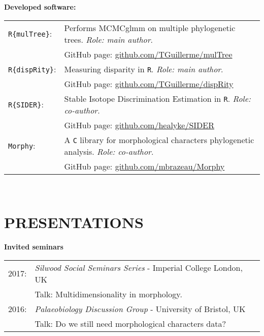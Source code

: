 \documentclass[10pt,a4paper]{article}
\begin{document}
{\raggedright\textbf{Developed software:}\\[1.5ex]
\begin{tabular}{ll}
\texttt{R\{mulTree\}}: & Performs MCMCglmm on multiple phylogenetic trees. \textit{Role: main author}.\\
                       & GitHub page: \href{https://github.com/TGuillerme/mulTree}{github.com/TGuillerme/mulTree} \\
\texttt{R\{dispRity\}}: & Measuring disparity in \texttt{R}. \textit{Role: main author}.\\
                       & GitHub page: \href{https://github.com/TGuillerme/dispRity}{github.com/TGuillerme/dispRity}\\
\texttt{R\{SIDER\}}: & Stable Isotope Discrimination Estimation in \texttt{R}. \textit{Role: co-author}. \\
                       & GitHub page: \href{https://github.com/healyke/SIDER}{github.com/healyke/SIDER} \\
\texttt{Morphy}: & A \texttt{C} library for morphological characters phylogenetic analysis. \textit{Role: co-author}. \\
                       & GitHub page: \href{https://github.com/mbrazeau/Morphy}{github.com/mbrazeau/Morphy} \\
\end{tabular} \\


\bigskip
\section{PRESENTATIONS}

\raggedright\textbf{Invited seminars}\\[1.5ex]
\begin{tabular}{ll}
2017: & \textit{Silwood Social Seminars Series} - Imperial College London, UK\\
& Talk: Multidimensionality in morphology.\\ 
2016: & \textit{Palaeobiology Discussion Group} - University of Bristol, UK\\
& Talk: Do we still need morphological characters data?\\ 
\end{tabular}

}
\end{document}
